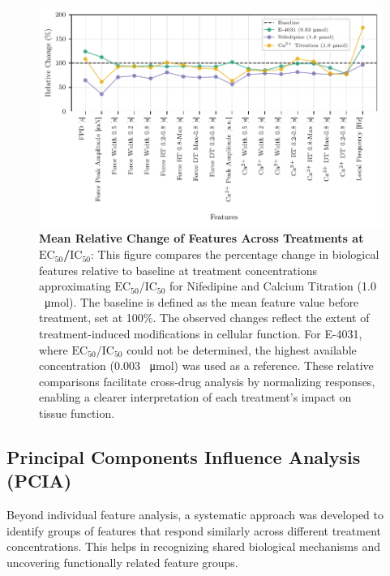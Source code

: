 \documentclass{report}
\begin{document}
        
        \begin{figure}[H]
            \centering
            \includegraphics[width=1\textwidth, keepaspectratio]{plots/chapter_6/ec_ic50_mean_relative_changes.pdf}
            \caption[Mean Relative Change of Features Across Treatments at \(\text{EC}_{50}\)/\(\text{IC}_{50}\)]{\textbf{Mean Relative Change of Features Across Treatments at \(\text{EC}_{50}\)/\(\text{IC}_{50}\)}:
            This figure compares the percentage change in biological features relative to baseline at treatment concentrations approximating \(\text{EC}_{50}\)/\(\text{IC}_{50}\) for Nifedipine and Calcium Titration (1.0 \SI{}{\umol}). The baseline is defined as the mean feature value before treatment, set at 100\%. The observed changes reflect the extent of treatment-induced modifications in cellular function. For E-4031, where \(\text{EC}_{50}\)/\(\text{IC}_{50}\) could not be determined, the highest available concentration (0.003 \SI{}{\umol}) was used as a reference. These relative comparisons facilitate cross-drug analysis by normalizing responses, enabling a clearer interpretation of each treatment’s impact on tissue function.}

            \label{fig:mean_relative_change_baseline_ec50}
        \end{figure}
        
   \subsection{Principal Components Influence Analysis (PCIA)}
    \label{sec:pcia}
        Beyond individual feature analysis, a systematic approach was developed to identify groups of features that respond similarly across different treatment concentrations. This helps in recognizing shared biological mechanisms and uncovering functionally related feature groups.
\end{document}
